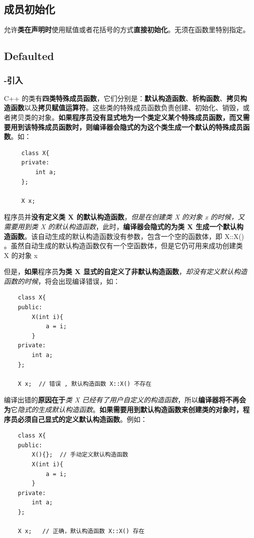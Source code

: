 \documentclass[UTF8,a4paper,12pt]{ctexbook} %
\begin{document}
		\subsection{成员初始化}
			允许\textbf{类在声明时}使用赋值或者花括号的方式\textbf{直接初始化}。无须在函数里特别指定。	
		\subsection{Defaulted}	
			\subsubsection{-引入}
				C++ 的类有\textbf{四类特殊成员函数}，它们分别是：\textbf{默认构造函数}、\textbf{析构函数}、\textbf{拷贝构造函数}以及\textbf{拷贝赋值运算符}。这些类的特殊成员函数负责创建、初始化、销毁，或者拷贝类的对象。\textbf{如果程序员没有显式地为一个类定义某个特殊成员函数，而又需要用到该特殊成员函数时，则编译器会隐式的为这个类生成一个默认的特殊成员函数}。如：
					\begin{lstlisting}
	 class X{ 
	 private: 
		 int a; 
	 }; 
	 
	 X x;					
					\end{lstlisting}
					
				程序员并\textbf{没有定义类 X 的默认构造函数}，\textit{但是在创建类 X 的对象 x 的时候，又需要用到类 X 的默认构造函数}，此时，\textbf{编译器会隐式的为类 X 生成一个默认构造函数}。该自动生成的默认构造函数没有参数，包含一个空的函数体，即 X::X(){ }。虽然自动生成的默认构造函数仅有一个空函数体，但是它仍可用来成功创建类 X 的对象 x
				
				但是，\textbf{如果}程序员\textbf{为类 X 显式的自定义了非默认构造函数}，\textit{却没有定义默认构造函数的时候}，将会出现编译错误，如：
					\begin{lstlisting}
	class X{ 
	public: 
		X(int i){ 
			a = i; 
		}     
	private: 
		int a; 
	}; 
	
	X x;  // 错误 , 默认构造函数 X::X() 不存在					
					\end{lstlisting}
				
				编译出错的\textbf{原因在于}\textit{类 X 已经有了用户自定义的构造函数}，所以\textbf{编译器将不再会为}它\textit{隐式的生成默认构造函数}。\textbf{如果需要用到默认构造函数来创建类的对象时，程序员必须自己显式的定义默认构造函数}。例如：
					\begin{lstlisting}
	class X{ 
	public: 
		X(){};  // 手动定义默认构造函数
		X(int i){ 
			a = i; 
		}     
	private: 
		int a; 
	}; 
	
	X x;   // 正确，默认构造函数 X::X() 存在					
					\end{lstlisting}	
					
\end{document}
